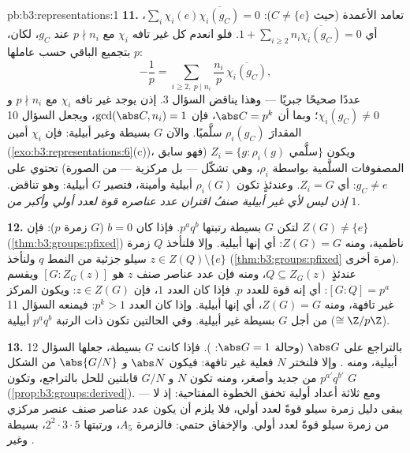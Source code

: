 \begin{solution}{pb:b3:representations:1}
\textbf{11.} تعامد الأعمدة (حيث $C \neq \{e\}$): $\sum_i \chi_i(e)\overline{\chi_i(g_C)} = 0$، أي
$1 +
\sum_{i \geq 2} n_i\overline{\chi_i(g_C)} = 0$. فلو انعدم كل  غير تافه $\chi_i$ مع $p \nmid n_i$
عند $g_C$، لكان، بتجميع الباقي حسب عاملها $p$:
\[
-\frac1p = \sum_{i \geq 2,\ p \mid n_i}
\frac{n_i}{p}\,\overline{\chi_i(g_C)},
\]
عددًا صحيحًا جبريًا --- وهذا يناقض السؤال 3. إذن يوجد  غير
تافه $\chi_i$ مع $p \nmid n_i$ و $\chi_i(g_C) \neq 0$؛ وبما أن
$\abs C = p^k$، فإن $\gcd(\abs C, n_i) = 1$، ويجعل السؤال 10 المقدارَ
$\rho_i(g_C)$ سلَّميًا. والآن $G$ بسيطة وغير أبيلية: فإن $\chi_i$
أمين (\cref{exo:b3:representations:6}(c))، ويكون $Z_i = \{g : \rho_i(g) \text{ سلَّمي}\}$  (فهو
سابق المصفوفات السلَّمية بواسطة $\rho_i$، وهي تشكّل  --- بل مركزية --- من الصورة) تحتوي على $g_C \neq e$: أي
$Z_i = G$. وعندئذٍ تكون $\rho_i(G)$ أبيلية وأمينة، فتصير $G$
أبيلية: وهو تناقض. \emph{إذن ليس لأي  غير أبيلية صنفُ
اقتران عدد عناصره قوة لعدد أولي وأكبر من $1$.}

\textbf{12.} لتكن $G$ بسيطة رتبتها $p^aq^b$. فإذا كان $b = 0$
($G$ زمرة $p$): فإن $Z(G) \neq \{e\}$ (\cref{thm:b3:groups:pfixed}) ناظمية، ومنه
$Z(G) = G$: أي إنها أبيلية. وإلا فلنأخذ $Q$ زمرة سيلو جزئية من
النمط $q$ ولنأخذ $z \in Z(Q)
\setminus\{e\}$ (\cref{thm:b3:groups:pfixed} مرة أخرى). عندئذٍ $Q
\subseteq Z_G(z)$،
ومنه فإن عدد عناصر صنف $z$ هو $[G : Z_G(z)]$ ويقسم
$[G : Q] = p^a$: أي إنه قوة للعدد $p$. فإذا كان العدد $1$، فإن
$z \in Z(G)$: ويكون المركز  غير تافهة، ومنه
$Z(G) = G$، أي إنها أبيلية. وإذا كان العدد $p^k > 1$: فيمنعه
السؤال 11 من أجل $G$ بسيطة غير أبيلية. وفي الحالتين تكون
 ذات الرتبة $p^aq^b$ أبيلية ($\cong \Z/p\Z$).

\textbf{13.} بالتراجع على $\abs G$ (وحالة $\abs G = 1$: ). فإذا كانت $G$ بسيطة، جعلها السؤال 12 أبيلية، ومنه . وإلا فلنختر $N$  فعلية غير تافهة:
فيكون $\abs
N$ و $\abs{G/N}$ من الشكل $p^{a'}q^{b'}$ من جديد
وأصغر، ومنه تكون $N$ و $G/N$ قابلتين للحل بالتراجع، وتكون $G$
 (\cref{prop:b3:groups:derived}). --- ومع ثلاثة أعداد أولية تخفق
الخطوة المفتاحية: إذ لا يبقى دليل زمرة سيلو قوةً لعدد أولي،
فلا يلزم أن يكون عدد عناصر صنف عنصر مركزي من زمرة سيلو قوةً
لعدد أولي. والإخفاق حتمي: فالزمرة $A_5$، ورتبتها $2^2\cdot3\cdot5$،
بسيطة وغير .


\end{solution}
